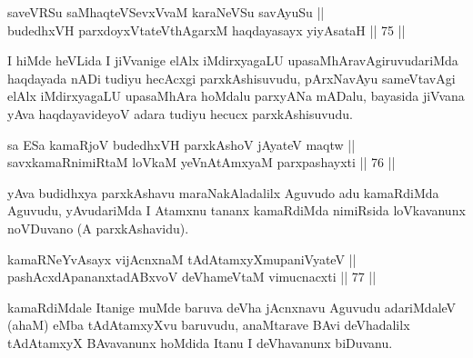 \begin{shl}
saveVRSu saMhaqteVSevxVvaM karaNeVSu savAyuSu ||  \\
budedhxVH parxdoyxVtateV\s thAgarxM haqdayasayx yiyAsataH \hfill || 75 ||  
\end{shl}

\begin{artha}
I hiMde heVLida I jiVvanige elAlx iMdirxyagaLU
upasaMhAravAgiruvudariMda haqdayada nADi tudiyu hecAcxgi
parxkAshisuvudu, pArxNavAyu sameVtavAgi elAlx iMdirxyagaLU upasaMhAra
hoMdalu parxyANa mADalu, bayasida jiVvana yAva haqdayavideyoV adara
tudiyu hecucx parxkAshisuvudu.
\end{artha}


\begin{shl}
sa ESa kamaRjoV budedhxVH parxkAshoV jAyateV maqtw || \\
savxkamaRnimiRtaM loVkaM yeVnA\s \s tAmx\s yaM parxpashayxti \hfill || 76 ||  
\end{shl}

\begin{artha}
yAva budidhxya parxkAshavu maraNakAladalilx Aguvudo adu kamaRdiMda
Aguvudu, yAvudariMda I Atamxnu tananx kamaRdiMda nimiRsida loVkavanunx
noVDuvano (A parxkAshavidu).
\end{artha}


\begin{shl}
kamaRNeYvAsayx vijAcnxnaM tAdAtamxyXmupaniVyateV || \\
pashAcxdApananxtadABxvoV deVhameVtaM vimucnacxti \hfill || 77 ||  
\end{shl}

\begin{artha}
kamaRdiMdale Itanige muMde baruva deVha jAcnxnavu Aguvudu adariMdaleV
(ahaM) eMba tAdAtamxyXvu baruvudu, anaMtarave BAvi deVhadalilx tAdAtamxyX
BAvavanunx hoMdida Itanu I deVhavanunx biDuvanu.
\end{artha}


